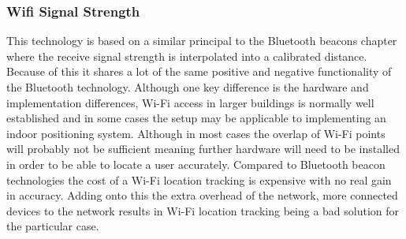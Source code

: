 \subsubsection{Wifi Signal Strength}
This technology is based on a similar principal to the Bluetooth beacons chapter where the receive signal strength is interpolated into a calibrated distance. Because of this it shares a lot of the same positive and negative functionality of the Bluetooth technology. Although one key difference is the hardware and implementation differences, Wi-Fi access in larger buildings is normally well established and in some cases the setup may be applicable to implementing an indoor positioning system. Although in most cases the overlap of Wi-Fi points will probably not be sufficient meaning further hardware will need to be installed in order to be able to locate a user accurately. Compared to Bluetooth beacon technologies the cost of a Wi-Fi location tracking is expensive with no real gain in accuracy. Adding onto this the extra overhead of the network, more connected devices to the network results in Wi-Fi location tracking being a bad solution for the particular case.